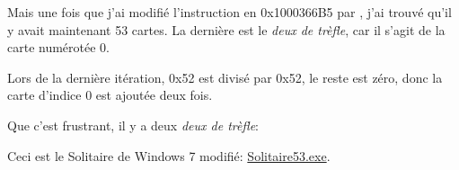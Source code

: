 Mais une fois que j'ai modifié l'instruction  en 0x1000366B5 par
, j'ai trouvé qu'il y avait maintenant 53 cartes.
La dernière est le \textit{deux de trèfle}, car il s'agit de la carte numérotée
0.

Lors de la dernière itération, 0x52 est divisé par 0x52, le reste est zéro, donc
la carte d'indice 0 est ajoutée deux fois.

Que c'est frustrant, il y a deux \textit{deux de trèfle}:

\begin{figure}[H]
\centering
{}
\end{figure}

Ceci est le Solitaire de Windows 7 modifié:
\href{\GitHubBlobMasterURL/examples/solitaire/53/Solitaire53.exe}{Solitaire53.exe}.

